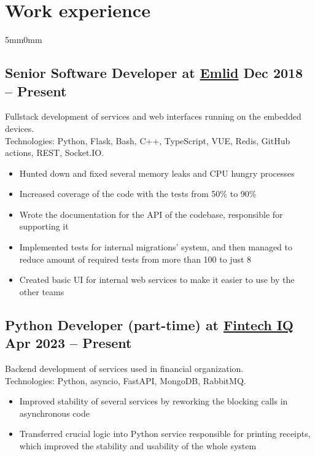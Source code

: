 \documentclass[10pt]{article}
\newcommand{\lmvalue}{5mm}
\newcommand{\rmvalue}{0mm}
\begin{document}
    \section*{Work experience}
    \begin{changemargin}{\lmvalue}{\rmvalue}
        \subsection*{Senior Software Developer at \href{https://emlid.com}{Emlid}
        \hfill {\color{gray}Dec 2018 – Present}}

        Fullstack development of services and web interfaces running on the embedded devices.\\
        Technologies: Python, Flask, Bash, C++, TypeScript, VUE, Redis, GitHub actions, REST, Socket.IO.
        \begin{itemize}
            \item Hunted down and fixed several memory leaks and CPU hungry processes
            \item Increased coverage of the code with the tests from 50\% to 90\%
            \item Wrote the documentation for the API of the codebase, responsible for supporting it
            \item Implemented tests for internal migrations' system, and then managed to reduce amount of required tests from more than 100 to just 8
            \item Created basic UI for internal web services to make it easier to use by the other teams
        \end{itemize}

		\subsection*{Python Developer (part-time) at \href{https://www.linkedin.com/company/fintech-iq/}{Fintech IQ}
		\hfill {\color{gray}Apr 2023 – Present}}

		Backend development of services used in financial organization.\\
		Technologies: Python, asyncio, FastAPI, MongoDB, RabbitMQ.
		\begin{itemize}
			\item Improved stability of several services by reworking the blocking calls in asynchronous code
			\item Transferred crucial logic into Python service responsible for printing receipts, which improved the stability and usability of the whole system
		\end{itemize}


\end{changemargin}
\end{document}
